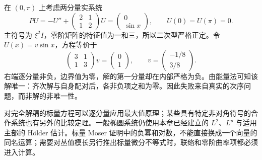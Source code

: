 \begin{example}\label{g3:exm:elliptic-system-no-order}
	在 \((0,\pi)\) 上考虑两分量实系统
	\[
		PU=-U''+\begin{pmatrix}2&1\\1&2\end{pmatrix}U
		=\begin{pmatrix}0\\\sin x\end{pmatrix},
		\qquad U(0)=U(\pi)=0.
	\]
	主符号为 \(\xi^2I\)，零阶矩阵的特征值为一和三，所以二次型严格正定。令 \(U(x)=v\sin x\)，方程等价于
	\[
		\begin{pmatrix}3&1\\1&3\end{pmatrix}v
		=\begin{pmatrix}0\\1\end{pmatrix},
		\qquad v=\begin{pmatrix}-1/8\\3/8\end{pmatrix}.
	\]
	右端逐分量非负，边界值为零，解的第一分量却在内部严格为负。由能量法可知该解唯一：齐次解与自身配对后，各非负项之和为零。因此失败来自真实的次序问题，而非解的非唯一性。
\end{example}

对完全解耦的标量方程可以逐分量应用最大值原理；某些具有特定非对角符号的合作系统也有另外的比较定理。一般椭圆系统仍使用本章已经建立的 \(L^2\)、\(L^p\) 与适用主部的 Hölder 估计。标量 Moser 证明中的负幂和对数，不能直接换成一个向量的同名运算；需要对丛值模长另行推出标量微分不等式时，联络和零阶曲率项都必须进入计算。

